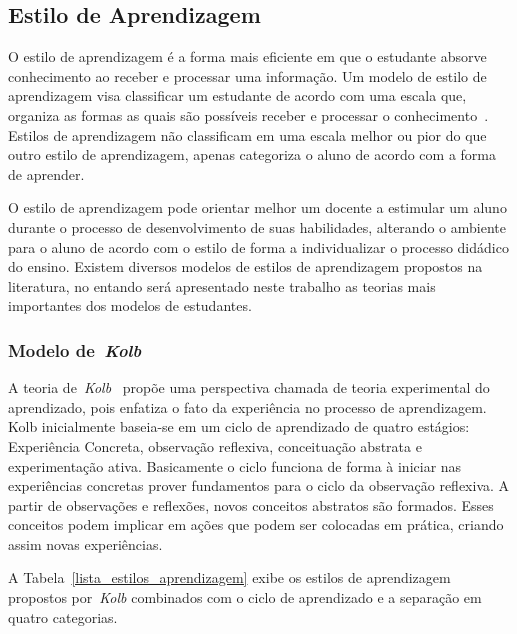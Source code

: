 \subsection{Estilo de Aprendizagem}
O estilo de aprendizagem é a forma mais eficiente em que o estudante absorve conhecimento ao receber e processar uma informação. Um modelo de estilo de aprendizagem visa classificar um estudante de acordo com uma escala que, organiza as formas as quais são possíveis receber e processar o conhecimento~\cite{felder1988learning}. Estilos de aprendizagem não classificam em uma escala melhor ou pior do que outro estilo de aprendizagem, apenas categoriza o aluno de acordo com a forma de aprender.

O estilo de aprendizagem pode orientar melhor um docente a estimular um aluno durante o processo de desenvolvimento de suas habilidades, alterando o ambiente para o aluno de acordo com o estilo de forma a individualizar o processo didádico do ensino. Existem diversos modelos de estilos de aprendizagem propostos na literatura, no entando será apresentado neste trabalho as teorias mais importantes dos modelos de estudantes.

\subsubsection{Modelo de~\emph{Kolb}}

A teoria de~\emph{Kolb}~\cite{kolb84} propõe uma perspectiva chamada de teoria experimental do aprendizado, pois enfatiza o fato da experiência no processo de aprendizagem. Kolb inicialmente baseia-se em um ciclo de aprendizado de quatro estágios: Experiência Concreta, observação reflexiva, conceituação abstrata e experimentação ativa. Basicamente o ciclo funciona de forma à iniciar nas experiências concretas prover fundamentos para o ciclo da observação reflexiva. A partir de observações e reflexões, novos conceitos abstratos são formados. Esses conceitos podem implicar em ações que podem ser colocadas em prática, criando assim novas experiências.

A Tabela~\ref{lista_estilos_aprendizagem} exibe os estilos de aprendizagem propostos por~\emph{Kolb} combinados com o ciclo de aprendizado e a separação em quatro categorias.

